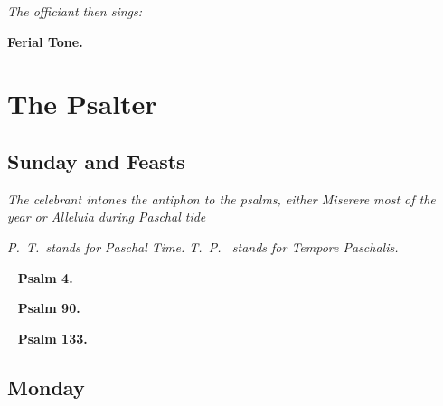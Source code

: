 \documentclass[a5paper,12pt,twoside,openany]{memoir}
\def\startParallel{}
\def\stopParallel{}
\renewcommand\Vbar{\makebox[1em][l]{\versicles v}}
\let\oldtextbf\textbf
\newcommand\rubrics[1]{\textit{#1}}
\newcommand\bibleref[2]{\oldtextbf{#1} \hfill \textit{#2}}
\newcommand\psalm[1]{~ \hfill \oldtextbf{Psalm #1.} \hfill ~}
\begin{document}
\rubrics{The officiant then sings:}


\bibleref{Ferial Tone.}{}

\gresetfirstlineaboveinitial{\Vbar}{\Vbar}

\chapter{The Psalter}

\section{Sunday and Feasts}

\rubrics{The celebrant intones the antiphon to the psalms, either \emph{Miserere} most of the year or \emph{Alleluia} during Paschal tide}


\rubrics{P.~T.~stands for Paschal Time.  T.~P.~ stands for Tempore Paschalis.}


\eject

\psalm{4}


\startParallel

\stopParallel

\psalm{90}


\startParallel

\stopParallel

\psalm{133}


\startParallel

\stopParallel




\section{Monday}
\end{document}
